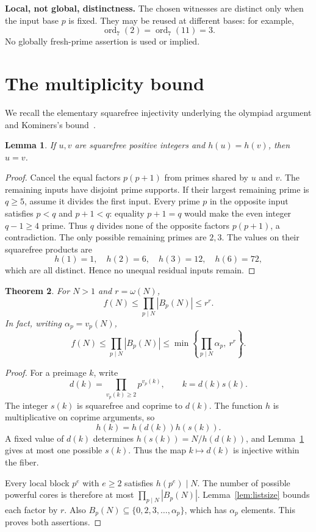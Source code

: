 \documentclass[11pt]{article}
\newtheorem{theorem}{Theorem}[section]
\newtheorem{lemma}[theorem]{Lemma}
\DeclareMathOperator{\ord}{ord}
\begin{document}
\textbf{Local, not global, distinctness.} The chosen witnesses are distinct only when the input base $p$ is fixed. They may be reused at different bases: for example,
\[
 \ord_7(2)=\ord_7(11)=3.
\]
No globally fresh-prime assertion is used or implied.

\section{The multiplicity bound}
We recall the elementary squarefree injectivity underlying the olympiad argument and Kominers's bound~\cite{kominers}.

\begin{lemma}\label{lem:squarefree}
If $u,v$ are squarefree positive integers and $h(u)=h(v)$, then $u=v$.
\end{lemma}
\begin{proof}
Cancel the equal factors $p(p+1)$ from primes shared by $u$ and $v$. The remaining inputs have disjoint prime supports. If their largest remaining prime is $q\ge5$, assume it divides the first input. Every prime $p$ in the opposite input satisfies $p<q$ and $p+1<q$: equality $p+1=q$ would make the even integer $q-1\ge4$ prime. Thus $q$ divides none of the opposite factors $p(p+1)$, a contradiction. The only possible remaining primes are $2,3$. The values on their squarefree products are
\[
 h(1)=1,\quad h(2)=6,\quad h(3)=12,\quad h(6)=72,
\]
which are all distinct. Hence no unequal residual inputs remain.
\end{proof}

\begin{theorem}\label{thm:main}
For $N>1$ and $r=\omega(N)$,
\begin{equation}\label{eq:main}
 \boxed{f(N)\le\prod_{p\mid N}|B_p(N)|\le r^r.}
\end{equation}
In fact, writing $\alpha_p=v_p(N)$,
\[
 f(N)\le\prod_{p\mid N}|B_p(N)|
 \le\min\!\left\{\prod_{p\mid N}\alpha_p,\ r^r\right\}.
\]
\end{theorem}
\begin{proof}
For a preimage $k$, write
\[
 d(k)=\prod_{v_p(k)\ge2}p^{v_p(k)},\qquad k=d(k)s(k).
\]
The integer $s(k)$ is squarefree and coprime to $d(k)$. The function $h$ is multiplicative on coprime arguments, so
\[
 h(k)=h(d(k))h(s(k)).
\]
A fixed value of $d(k)$ determines $h(s(k))=N/h(d(k))$, and Lemma~\ref{lem:squarefree} gives at most one possible $s(k)$. Thus the map $k\mapsto d(k)$ is injective within the fiber.

Every local block $p^e$ with $e\ge2$ satisfies $h(p^e)\mid N$. The number of possible powerful cores is therefore at most $\prod_{p\mid N}|B_p(N)|$. Lemma~\ref{lem:listsize} bounds each factor by $r$. Also $B_p(N)\subseteq\{0,2,3,\ldots,\alpha_p\}$, which has $\alpha_p$ elements. This proves both assertions.
\end{proof}
\end{document}
